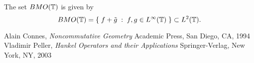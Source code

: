 \documentclass{unswmaths}
\begin{document}
\begin{definition}
    The set ${BMO}(\mathbb{T})$ is given by
    \begin{equation*}
        BMO(\mathbb{T}) = \{\;f+\tilde{g}\;:\;f,g \in L^\infty(\mathbb{T})\;\} \subset L^2(\mathbb{T}).
    \end{equation*}
\end{definition}


\begin{thebibliography}{9}
    Alain Connes, 
    \emph{Noncommutative Geometry}
     Academic Press, 
     San Diego, 
     CA, 
     1994
    Vladimir Peller,
    \emph{Hankel Operators and their Applications}
    Springer-Verlag,
    New York, 
    NY,
    2003
    
\end{thebibliography}
\end{document}
